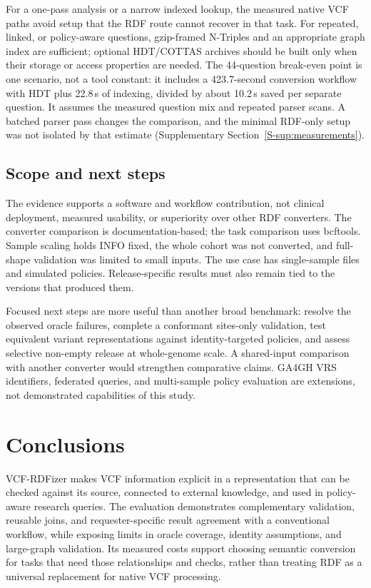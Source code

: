 \documentclass[pdflatex,sn-mathphys-num]{sn-jnl}
\begin{document}
For a one-pass analysis or a narrow indexed lookup, the measured native VCF paths avoid setup that the RDF route cannot recover in that task. For repeated, linked, or policy-aware questions, gzip-framed N-Triples and an appropriate graph index are sufficient; optional HDT/COTTAS archives should be built only when their storage or access properties are needed. 
The 44-question break-even point is one scenario, not a tool constant: it includes a 423.7-second conversion workflow with HDT plus 22.8\,s of indexing, divided by about 10.2\,s saved per separate question. 
It assumes the measured question mix and repeated parser scans. 
A batched parser pass changes the comparison, and the minimal RDF-only setup was not isolated by that estimate (Supplementary Section~\ref{S-sup:measurements}).

\subsection{Scope and next steps}\label{subsec4.3}
The evidence supports a software and workflow contribution, not clinical deployment, measured usability, or superiority over other RDF converters. 
The converter comparison is documentation-based; the task comparison uses bcftools. 
Sample scaling holds INFO fixed, the whole cohort was not converted, and full-shape validation was limited to small inputs. 
The use case has single-sample files and simulated policies. 
Release-specific results must also remain tied to the versions that produced them.

Focused next steps are more useful than another broad benchmark: resolve the observed oracle failures, complete a conformant sites-only validation, test equivalent variant representations against identity-targeted policies, and assess selective non-empty release at whole-genome scale. 
A shared-input comparison with another converter would strengthen comparative claims. 
GA4GH VRS identifiers, federated queries, and multi-sample policy evaluation are extensions, not demonstrated capabilities of this study.

\section{Conclusions}\label{sec:conclusions}
VCF-RDFizer makes VCF information explicit in a representation that can be checked against its source, connected to external knowledge, and used in policy-aware research queries. 
The evaluation demonstrates complementary validation, reusable joins, and requester-specific result agreement with a conventional workflow, while exposing limits in oracle coverage, identity assumptions, and large-graph validation. 
Its measured costs support choosing semantic conversion for tasks that need those relationships and checks, rather than treating RDF as a universal replacement for native VCF processing.
\end{document}
